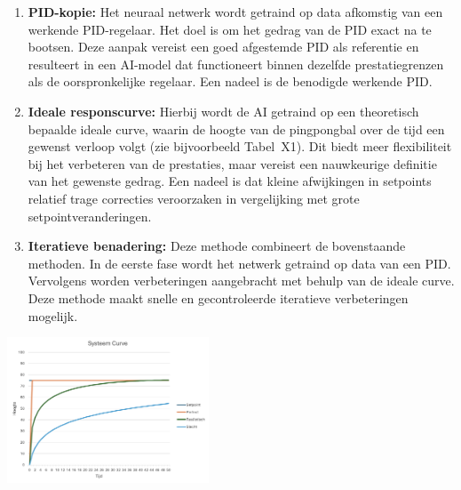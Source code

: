 \begin{enumerate}
    \item \textbf{PID-kopie:} Het neuraal netwerk wordt getraind op data afkomstig van een werkende PID-regelaar. Het doel is om het gedrag van de PID exact na te bootsen. Deze aanpak vereist een goed afgestemde PID als referentie en resulteert in een AI-model dat functioneert binnen dezelfde prestatiegrenzen als de oorspronkelijke regelaar. Een nadeel is de benodigde werkende PID.
    \item \textbf{Ideale responscurve:} Hierbij wordt de AI getraind op een theoretisch bepaalde ideale curve, waarin de hoogte van de pingpongbal over de tijd een gewenst verloop volgt (zie bijvoorbeeld Tabel~X1). Dit biedt meer flexibiliteit bij het verbeteren van de prestaties, maar vereist een nauwkeurige definitie van het gewenste gedrag. Een nadeel is dat kleine afwijkingen in setpoints relatief trage correcties veroorzaken in vergelijking met grote setpointveranderingen.
    \item \textbf{Iteratieve benadering:} Deze methode combineert de bovenstaande methoden. In de eerste fase wordt het netwerk getraind op data van een PID. Vervolgens worden verbeteringen aangebracht met behulp van de ideale curve. Deze methode maakt snelle en gecontroleerde iteratieve verbeteringen mogelijk.
\end{enumerate}

\begin{center}
\centering
\includegraphics[width=0.45\textwidth]{./afbeeldingen/dataverzameling.png}
\label{fig:manieren van dataverzameling voor het trainen van het neuraal netwerk}
\end{center}

